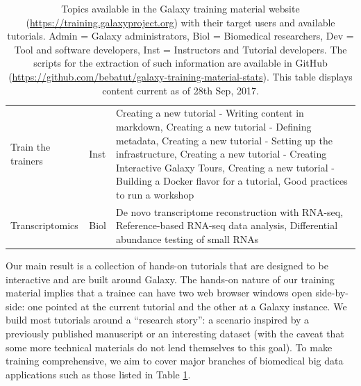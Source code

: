 \begin{table}{}
\begin{tabular}{llp{10cm}}
    Train the trainers & Inst & Creating a new tutorial - Writing content in markdown, Creating a new tutorial - Defining metadata, Creating a new tutorial - Setting up the infrastructure, Creating a new tutorial - Creating Interactive Galaxy Tours, Creating a new tutorial - Building a Docker flavor for a tutorial, Good practices to run a workshop \\

    Transcriptomics & Biol & De novo transcriptome reconstruction with RNA-seq, Reference-based RNA-seq data analysis, Differential abundance testing of small RNAs \\

    \hline
    \end{tabular}
    \caption{Topics available in the Galaxy training material website (\url{https://training.galaxyproject.org}) with their target users and available tutorials. Admin = Galaxy administrators, Biol = Biomedical researchers, Dev = Tool and software developers, Inst = Instructors and Tutorial developers. The scripts for the extraction of such information are available in GitHub (\url{https://github.com/bebatut/galaxy-training-material-stats}). This table displays content current as of 28th Sep, 2017.}
    \label{table:tutorialtable}
\end{table}

Our main result is a collection of hands-on tutorials that are designed to be interactive and are built around Galaxy. The hands-on nature of our training material implies that a trainee can have two web browser windows open side-by-side: one pointed at the current tutorial and the other at a Galaxy instance. We build most tutorials around a “research story”: a scenario inspired by a previously published manuscript or an interesting dataset (with the caveat that some more technical materials do not lend themselves to this goal). To make training comprehensive, we aim to cover major branches of biomedical big data applications such as those listed in Table \ref{table:tutorialtable}.

